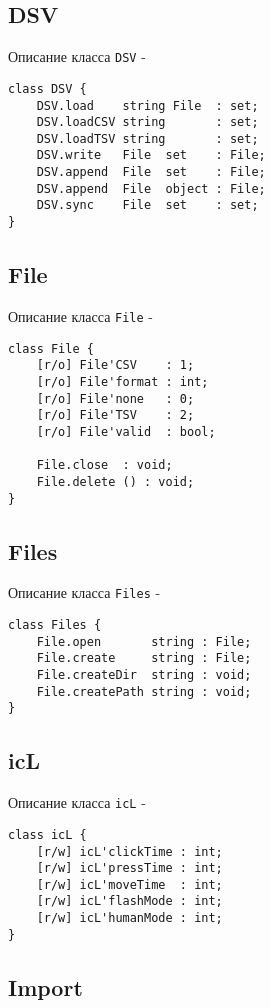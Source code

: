\subsection{{\color{orange} DSV}}

\noindent Описание класса \texttt{DSV} -
\begin{verbatim}
class DSV {
    DSV.load    string File  : set;
	DSV.loadCSV string       : set;
	DSV.loadTSV string       : set;
	DSV.write   File  set    : File;
	DSV.append  File  set    : File;
	DSV.append  File  object : File;
	DSV.sync    File  set    : set;
}
\end{verbatim}

\subsection{{\color{orange} File}}

\noindent Описание класса \texttt{File} -
\begin{verbatim}
class File {
    [r/o] File'CSV    : 1;
	[r/o] File'format : int;
	[r/o] File'none   : 0;
	[r/o] File'TSV    : 2;
	[r/o] File'valid  : bool;
	
    File.close  : void;
	File.delete () : void;
}
\end{verbatim}

\subsection{{\color{orange} Files}}

\noindent Описание класса \texttt{Files} -
\begin{verbatim}
class Files {
    File.open       string : File;
	File.create     string : File;
	File.createDir  string : void;
	File.createPath string : void;
}
\end{verbatim}

\subsection{{\color{orange} icL}}

\noindent Описание класса \texttt{icL} -
\begin{verbatim}
class icL {
    [r/w] icL'clickTime : int;
	[r/w] icL'pressTime : int;
	[r/w] icL'moveTime  : int;
	[r/w] icL'flashMode : int;
	[r/w] icL'humanMode : int;
}
\end{verbatim}

\subsection{{\color{orange} Import}}


